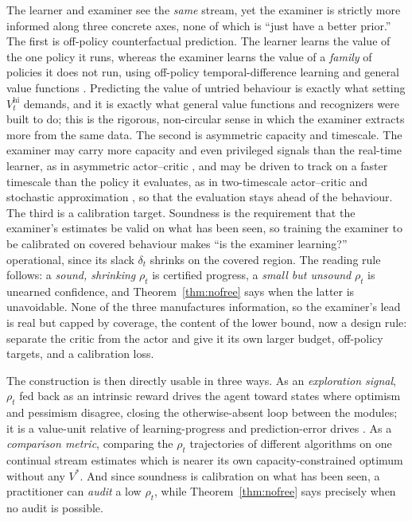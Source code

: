 \documentclass[10pt]{article} %
\theoremstyle{definition}
\theoremstyle{plain}
\newcommand{\Vhi}{V^{\mathrm{hi}}_t}
\begin{document}
The learner and examiner see the \emph{same} stream, yet the examiner is strictly more informed along three concrete axes, none of which is ``just have a better prior.'' The first is off-policy counterfactual prediction. The learner learns the value of the one policy it runs, whereas the examiner learns the value of a \emph{family} of policies it does not run, using off-policy temporal-difference learning and general value functions \citep{sutton2011horde,precup2001offpolicy,modayil2014nexting}. Predicting the value of untried behaviour is exactly what setting $\Vhi$ demands, and it is exactly what general value functions and recognizers were built to do; this is the rigorous, non-circular sense in which the examiner extracts more from the same data. The second is asymmetric capacity and timescale. The examiner may carry more capacity and even privileged signals than the real-time learner, as in asymmetric actor--critic \citep{pinto2018asymmetric}, and may be driven to track on a faster timescale than the policy it evaluates, as in two-timescale actor--critic and stochastic approximation \citep{konda2000actorcritic,borkar1997twotimescale}, so that the evaluation stays ahead of the behaviour. The third is a calibration target. Soundness is the requirement that the examiner's estimates be valid on what has been seen, so training the examiner to be calibrated on covered behaviour \citep{foster1998calibration} makes ``is the examiner learning?'' operational, since its slack $\delta_t$ shrinks on the covered region. The reading rule follows: a \emph{sound, shrinking} $\rho_t$ is certified progress, a \emph{small but unsound} $\rho_t$ is unearned confidence, and Theorem~\ref{thm:nofree} says when the latter is unavoidable. None of the three manufactures information, so the examiner's lead is real but capped by coverage, the content of the lower bound, now a design rule: separate the critic from the actor and give it its own larger budget, off-policy targets, and a calibration loss.

The construction is then directly usable in three ways. As an \emph{exploration signal}, $\rho_t$ fed back as an intrinsic reward drives the agent toward states where optimism and pessimism disagree, closing the otherwise-absent loop between the modules; it is a value-unit relative of learning-progress and prediction-error drives \citep{schmidhuber2010formal,oudeyer2007intrinsic,bellemare2016count,pathak2017curiosity,burda2019rnd}. As a \emph{comparison metric}, comparing the $\rho_t$ trajectories of different algorithms on one continual stream estimates which is nearer its own capacity-constrained optimum without any $V^{*}$. And since soundness is calibration on what has been seen, a practitioner can \emph{audit} a low $\rho_t$, while Theorem~\ref{thm:nofree} says precisely when no audit is possible.
\end{document}
